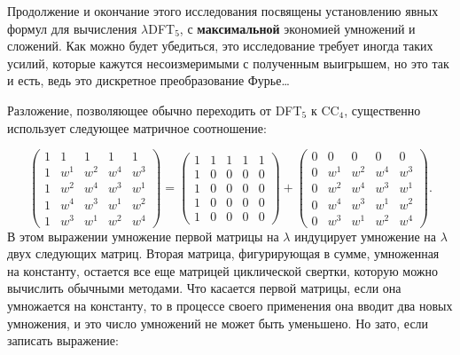\documentclass{mai_book}
\begin{document}
Продолжение и окончание этого исследования посвящены установлению явных формул для вычисления $\lambda$D{\footnotesize FT}$_5$, с \textbf{максимальной} экономией умножений и сложений. Как можно будет убедиться, это исследование требует иногда таких усилий, которые кажутся несоизмеримыми с полученным выигрышем, но это так и есть, ведь это дискретное преобразование Фурье\dots \par
Разложение, позволяющее обычно переходить от D{\footnotesize FT}$_5$ к C{\footnotesize C}$_4$, существенно использует следующее матричное соотношение:\par
$$\begin{pmatrix} 1 & 1 & 1 & 1 & 1 \\ 1 & w^1 & w^2 & w^4 & w^3 \\ 1 & w^2 & w^4 & w^3 & w^1 \\ 1 & w^4 & w^3 & w^1 & w^2 \\ 1 & w^3 & w^1 & w^2 & w^4 \end{pmatrix} = \begin{pmatrix} 1 & 1 & 1 & 1 & 1 \\ 1 & 0 & 0 & 0 & 0 \\ 1 & 0 & 0 & 0 & 0 \\ 1 & 0 & 0 & 0 & 0 \\ 1 & 0 &0 & 0 & 0 \end{pmatrix} + \begin{pmatrix} 0 & 0 & 0 & 0 & 0 \\ 0 & w^1 & w^2 & w^4 & w^3 \\ 0 & w^2 & w^4 & w^3 & w^1 \\ 0 & w^4 & w^3 & w^1 & w^2 \\ 0 & w^3 & w^1 & w^2 & w^4 \end{pmatrix}.$$\noindent
В этом выражении умножение первой матрицы на $\lambda$ индуцирует умножение на $\lambda$ двух следующих матриц. Вторая матрица, фигурирующая в сумме, умноженная на константу, остается все еще матрицей циклической свертки, которую можно вычислить обычными методами. Что касается первой матрицы, если она умножается на константу, то в процессе своего применения она вводит два новых умножения, и это число умножений не может быть уменьшено. Но зато, если записать выражение:\par
\end{document}

